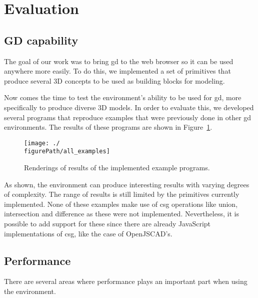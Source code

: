 
\section{Evaluation}
\label{sec:evaluation}


\subsection{GD capability}
The goal of our work was to bring \gls{gd} to the web browser so it can be used anywhere more easily.
To do this, we implemented a set of primitives that produce several 3D concepts to be used as building blocks for modeling.

Now comes the time to test the environment's ability to be used for \gls{gd}, more specifically to produce diverse 3D models.
In order to evaluate this, we developed several programs that reproduce examples that were previously done in other \gls{gd} environments.
The results of these programs are shown in Figure~\ref{fig:all:examples}.

\begin{figure}
  \centering
  \texttt{[image: ./\\figurePath/all\_examples]}
  \caption{Renderings of results of the implemented example programs.}
  \label{fig:all:examples}
\end{figure}

As shown, the environment can produce interesting results with varying degrees of complexity.
The range of results is still limited by the primitives currently implemented.
None of these examples make use of \gls{csg} operations like union, intersection and difference as these were not implemented.
Nevertheless, it is possible to add support for these since there are already JavaScript implementations of \gls{csg}, like the case of OpenJSCAD's.




\subsection{Performance}
There are several areas where performance plays an important part when using the environment.

